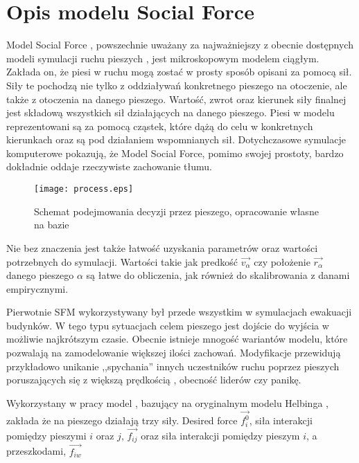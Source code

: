 \chapter{Opis modelu Social Force}
\label{cha:OpisSocialForce}

Model Social Force \cite{SforceModelForPedDyn}, powszechnie uważany za najważniejszy z obecnie dostępnych modeli symulacji ruchu pieszych \cite{HeBuAjTw}, jest mikroskopowym modelem ciągłym. Zakłada on, że piesi w ruchu mogą zostać w prosty sposób opisani za pomocą sił. Siły te pochodzą nie tylko z oddziaływań konkretnego pieszego na otoczenie, ale także z otoczenia na danego pieszego. Wartość, zwrot oraz kierunek siły finalnej jest składową wszystkich sił działających na danego pieszego. Piesi w modelu reprezentowani są za pomocą cząstek, które dążą do celu w konkretnych kierunkach oraz są pod działaniem wspomnianych sił. Dotychczasowe symulacje komputerowe pokazują, że Model Social Force, pomimo swojej prostoty, bardzo dokładnie oddaje rzeczywiste zachowanie tłumu.

\begin{figure}
\centering
\texttt{[image: process.eps]}
\caption{Schemat podejmowania decyzji przez pieszego, opracowanie własne na bazie \cite{GuideCrowdDynViaModifiedSocialForceModel}}
\end{figure}

Nie bez znaczenia jest także łatwość uzyskania parametrów oraz wartości potrzebnych do symulacji. Wartości takie jak predkość $\vec{v_{\alpha}}$ czy położenie $\vec{r_{\alpha}}$ danego pieszego $\alpha$ są łatwe do obliczenia, jak również do skalibrowania z danami empirycznymi.

Pierwotnie SFM wykorzystywany był przede wszystkim w symulacjach ewakuacji budynków. W tego typu sytuacjach celem pieszego jest dojście do wyjścia w możliwie najkrótszym czasie. Obecnie istnieje mnogość wariantów modelu, które pozwalają na zamodelowanie większej ilości zachowań. Modyfikacje przewidują przykładowo unikanie ,,spychania'' innych uczestników ruchu poprzez pieszych poruszających się z większą prędkością \cite{6}, obecność liderów czy panikę.

Wykorzystany w pracy model \cite{GuideCrowdDynViaModifiedSocialForceModel}, bazujący na oryginalnym modelu Helbinga \cite{SforceModelForPedDyn}, zakłada że na pieszego działają trzy siły. Desired force $\vec{f_{i}^{0}}$, siła interakcji pomiędzy pieszymi $i$ oraz $j$, $\vec{f_{ij}}$ oraz siła interakcji pomiędzy pieszym $i$, a przeszkodami, $\vec{f_{iw}}$

